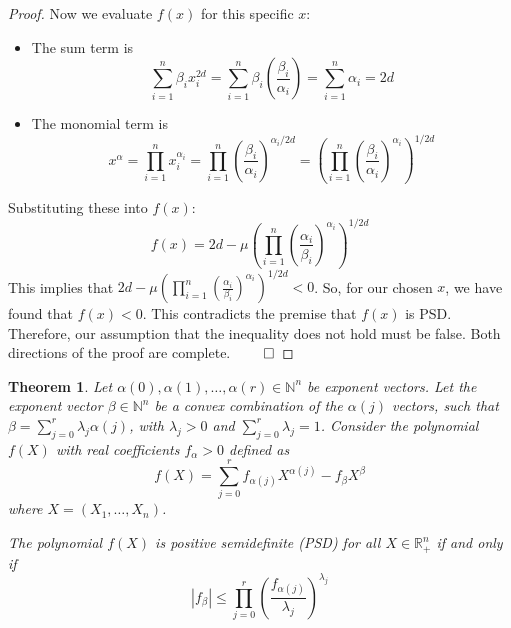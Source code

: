 \documentclass{article}
\newtheorem{theorem}{Theorem}
\begin{document}
\begin{proof}
Now we evaluate $f(x)$ for this specific $x$:
\begin{itemize}
   \item The sum term is
   \[
      \sum_{i=1}^n \beta_i x_i^{2d} = \sum_{i=1}^n \beta_i \left( \frac{\beta_i}{\alpha_i} \right) = \sum_{i=1}^n \alpha_i = 2d
   \]
   \item The monomial term is
   \[
      x^{\alpha} = \prod_{i=1}^n x_i^{\alpha_i} = \prod_{i=1}^n \left( \frac{\beta_i}{\alpha_i} \right)^{\alpha_i/2d} = \left( \prod_{i=1}^n \left( \frac{\beta_i}{\alpha_i} \right)^{\alpha_i} \right)^{1/2d}
   \]
\end{itemize}
Substituting these into $f(x)$:
\[
   f(x) = 2d - \mu \left( \prod_{i=1}^n \left( \frac{\alpha_i}{\beta_i} \right)^{\alpha_i} \right)^{1/2d}
\]
This implies that $2d - \mu \left( \prod_{i=1}^n \left( \frac{\alpha_i}{\beta_i} \right)^{\alpha_i} \right)^{1/2d} < 0$. 
So, for our chosen $x$, we have found that $f(x) < 0$. This contradicts the premise that $f(x)$ is PSD. Therefore, 
our assumption that the inequality does not hold must be false.
Both directions of the proof are complete. $\qed$
\end{proof}

\begin{theorem}
Let $\alpha(0), \alpha(1), \dots, \alpha(r) \in \mathbb{N}^n$ be exponent vectors. Let the exponent vector 
$\beta \in \mathbb{N}^n$ be a convex combination of the $\alpha(j)$ vectors, such that $\beta = \sum_{j=0}^r \lambda_j \alpha(j)$, 
with $\lambda_j > 0$ and $\sum_{j=0}^r \lambda_j = 1$. Consider the polynomial $f(X)$ with real coefficients $f_{\alpha} > 0$ 
defined as
\[
   f(X) = \sum_{j=0}^r f_{\alpha(j)} X^{\alpha(j)} - f_{\beta} X^{\beta}
\]
where $X = (X_1, \dots, X_n)$.

The polynomial $f(X)$ is positive semidefinite (PSD) for all $X \in \mathbb{R}_+^n$ if and only if
\[
   |f_{\beta}| \leq \prod_{j=0}^r \left( \frac{f_{\alpha(j)}}{\lambda_j} \right)^{\lambda_j}
\]
\end{theorem}
\end{document}
